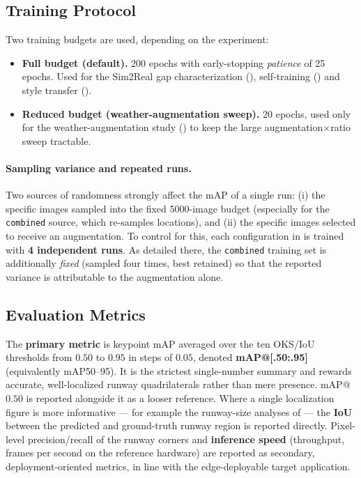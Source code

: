 \subsection{Training Protocol}
\label{subsec:setup-protocol}
Two training budgets are used, depending on the experiment:
\begin{itemize}
    \item \textbf{Full budget (default).} 200 epochs with early-stopping
    \emph{patience} of 25 epochs. Used for the Sim2Real gap characterization
    (), self-training () and style transfer
    ().
    \item \textbf{Reduced budget (weather-augmentation sweep).} 20 epochs, used only
    for the weather-augmentation study () to keep the large
    augmentation$\times$ratio sweep tractable.
\end{itemize}

\paragraph{Sampling variance and repeated runs.}
Two sources of randomness strongly affect the mAP of a single run: (i) the specific
images sampled into the fixed 5000-image budget (especially for the \texttt{combined}
source, which re-samples locations), and (ii) the specific images selected to receive
an augmentation. To control for this, each configuration in  is
trained with \textbf{4 independent runs}. As detailed there, the \texttt{combined}
training set is additionally \emph{fixed} (sampled four times, best retained) so that
the reported variance is attributable to the augmentation alone.

\subsection{Evaluation Metrics}
\label{subsec:setup-metrics}
The \textbf{primary metric} is keypoint \ac{mAP} averaged over the ten \ac{OKS}/\ac{IoU}
thresholds from $0.50$ to $0.95$ in steps of $0.05$, denoted \textbf{mAP@[.50:.95]}
(equivalently mAP50--95). It is the strictest single-number summary and rewards
accurate, well-localized runway quadrilaterals rather than mere presence.
mAP@$0.50$ is reported alongside it as a looser reference. Where a single localization
figure is more informative --- for example the runway-size analyses of
 --- the \textbf{\ac{IoU}} between the predicted and ground-truth runway
region is reported directly. Pixel-level precision/recall of the runway corners and
\textbf{inference speed} (throughput, frames per second on the reference hardware) are
reported as secondary, deployment-oriented metrics, in line with the edge-deployable
target application.

